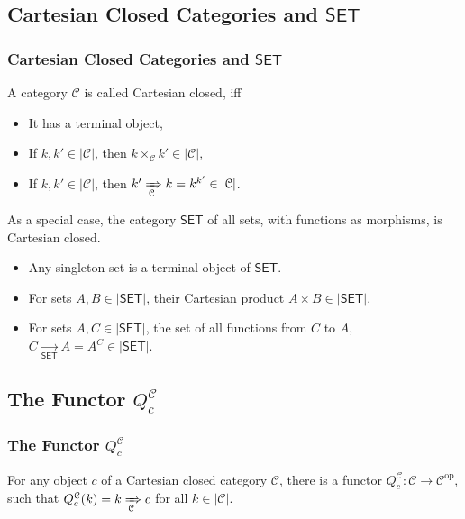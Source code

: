 \subsection{Cartesian Closed Categories and $\mathsf{SET}$}

\begin{frame}[fragile]
    \frametitle{Cartesian Closed Categories and $\mathbf{\mathsf{SET}}$}
    
    A category $\mathcal{C}$ is called Cartesian closed, iff
    \begin{itemize}
        \item It has a terminal object,
        \item If $k, k' \in |\mathcal{C}|$, then $k \times_\mathcal{C} k' \in |\mathcal{C}|$,
        \item If $k, k' \in |\mathcal{C}|$, then $k' \xRightarrow[\mathcal{C}]{} k = k^{k'} \in |\mathcal{C}|$.
    \end{itemize}
    
    \vspace{1em}
    As a special case, the category $\mathsf{SET}$ of all sets, with functions as morphisms, is Cartesian closed.
    \begin{itemize}
        \item Any singleton set is a terminal object of $\mathsf{SET}$.
        \item For sets $A, B \in |\mathsf{SET}|$, their Cartesian product $A \times B \in |\mathsf{SET}|$.
        \item For sets $A, C \in |\mathsf{SET}|$, the set of all functions from $C$ to $A$, $C \xrightarrow[\mathsf{SET}]{} A = A^C \in |\mathsf{SET}|$.
    \end{itemize}
\end{frame}

\subsection{The Functor $Q_c^\mathcal{C}$}

\begin{frame}[fragile]
    \frametitle{The Functor $Q_c^\mathcal{C}$}
    
    For any object $c$ of a Cartesian closed category $\mathcal{C}$, there is a functor $Q_c^\mathcal{C} \colon \mathcal{C} \rightarrow \mathcal{C}^{\mathrm{op}}$, such that $Q_c^\mathcal{C}(k) = k \xRightarrow[\mathcal{C}]{} c$ for all $k \in |\mathcal{C}|$.
\end{frame}

